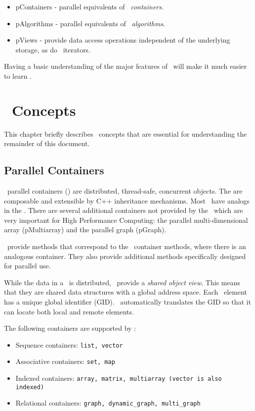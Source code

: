 \documentclass{report}
\begin{document}
\begin{itemize}
\item
pContainers - parallel equivalents of \stl\ \emph{containers}.
\item
pAlgorithms - parallel equivalents of \stl\ \emph{algorithms}.
\item
pViews - provide data access operations independent of the underlying
storage, as do \stl\ iterators.
\end{itemize}

Having a basic understanding of the major features of \stl\ will make it
much easier to learn \stapl.


\chapter{\stapl\ Concepts}

This chapter briefly describes \stapl\ concepts that are
essential for understanding the remainder of this document.

\section{Parallel Containers}

\stapl\ parallel containers (\pcontainers) are distributed,
thread-safe, concurrent objects.  The are composable and extensible
by C++ inheritance mechanisms.  Most \pcontainers\ have analogs in the
\stl.  There are several additional containers not provided by the \stl\
which are very important for High Performance Computing: the parallel
multi-dimensional array (pMultiarray) and the parallel graph (pGraph).

\pcontainers\ provide methods that correspond to the \stl\ container
methods, where there is an analogous container.  They also provide
additional methods specifically designed for parallel use.

While the data in a \pcontainer\ is distributed, \pcontainers\ provide a
\emph{shared object view}.  This means that they are shared data structures
with a global address space.  Each \pcontainer\ element has a unique
global identifier (GID).  \stapl\ automatically translates the GID so that
it can locate both local and remote elements.

The following containers are supported by \stapl:
\begin{itemize}
\item
Sequence containers: {\tt list, vector }
\item
Associative containers: {\tt set, map }
\item
Indexed containers: {\tt array, matrix, multiarray (vector is also indexed) }
\item
Relational containers: {\tt graph, dynamic\_graph, multi\_graph }
\end{itemize}
\end{document}
